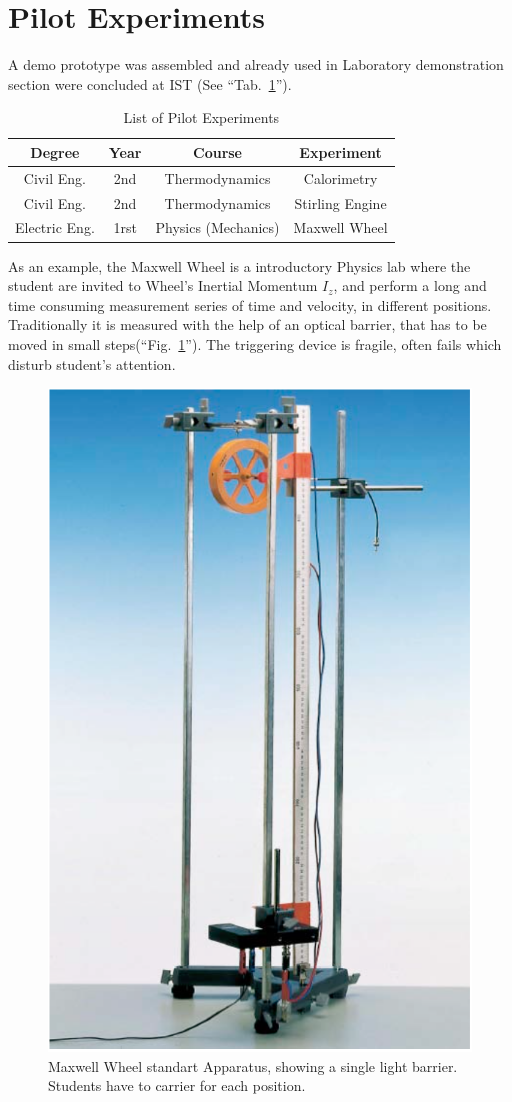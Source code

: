 \documentclass[conference]{IEEEtran}
\begin{document}
\section{Pilot Experiments}
A demo prototype was assembled and already used in Laboratory demonstration section  were concluded at IST (See ``Tab.~\ref{tab1}'').

\begin{table}[htbp]
\caption{List of Pilot Experiments}
\begin{center}
\begin{tabular}{|c|c|c|c|}
\hline
\textbf{Degree}&\textbf{Year}&\textbf{Course} &\textbf{Experiment}\\
\hline
Civil Eng. & 2nd&  Thermodynamics & Calorimetry\\
\hline
Civil Eng. & 2nd&  Thermodynamics & Stirling Engine\\
\hline
 Electric Eng.& 1rst&  Physics (Mechanics) & Maxwell Wheel\\
\hline
\end{tabular}
\label{tab1}
\end{center}
\end{table}

As an example, the Maxwell Wheel is a introductory Physics lab where the student are invited to Wheel's Inertial Momentum  $I_z$,
and perform a long and time consuming measurement series of time and velocity,
in different positions.
Traditionally it is measured  with the help of an optical barrier, that has to be moved in small steps(``Fig.~\ref{figMaxwell}''). 
The triggering device is fragile, often fails which disturb student's attention. 

\begin{figure}[htbp]
    \centerline{\includegraphics[width=.6\columnwidth]{maxwell.png}}
    \caption{Maxwell Wheel standart Apparatus, showing a single light barrier. Students have to carrier for each position.}
\label{figMaxwell}
\end{figure}
\end{document}
